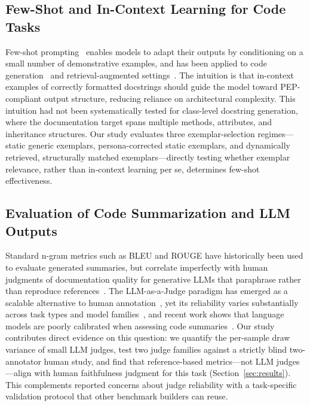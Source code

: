 \documentclass[pdflatex,sn-mathphys-ay]{sn-jnl}%
\theoremstyle{thmstyleone}%
\theoremstyle{thmstyletwo}%
\theoremstyle{thmstylethree}%
\begin{document}
\subsection{Few-Shot and In-Context Learning for Code Tasks}
Few-shot prompting~\cite{brown2020languagemodelsfewshotlearners} enables models to adapt their outputs by conditioning on a small number of demonstrative examples, and has been applied to code generation~\cite{beyond} and retrieval-augmented settings~\cite{Izacard2022}. The intuition is that in-context examples of correctly formatted docstrings should guide the model toward PEP-compliant output structure, reducing reliance on architectural complexity. This intuition had not been systematically tested for class-level docstring generation, where the documentation target spans multiple methods, attributes, and inheritance structures. Our study evaluates three exemplar-selection regimes---static generic exemplars, persona-corrected static exemplars, and dynamically retrieved, structurally matched exemplars---directly testing whether exemplar relevance, rather than in-context learning per se, determines few-shot effectiveness.

\subsection{Evaluation of Code Summarization and LLM Outputs}
Standard n-gram metrics such as BLEU and ROUGE have historically been used to evaluate generated summaries, but correlate imperfectly with human judgments of documentation quality for generative LLMs that paraphrase rather than reproduce references~\cite{Sun2023AutomaticCS}. The LLM-as-a-Judge paradigm has emerged as a scalable alternative to human annotation~\cite{li-etal-2025-generation,bavaresco-etal-2025-llms}, yet its reliability varies substantially across task types and model families~\cite{bavaresco-etal-2025-llms}, and recent work shows that language models are poorly calibrated when assessing code summaries~\cite{calibrationcodesumm2025}.
Our study contributes direct evidence on this question: we quantify the per-sample draw variance of small LLM judges, test two judge families against a strictly blind two-annotator human study, and find that reference-based metrics---not LLM judges---align with human faithfulness judgment for this task (Section~\ref{sec:results}). This complements reported concerns about judge reliability with a task-specific validation protocol that other benchmark builders can reuse.
\end{document}
